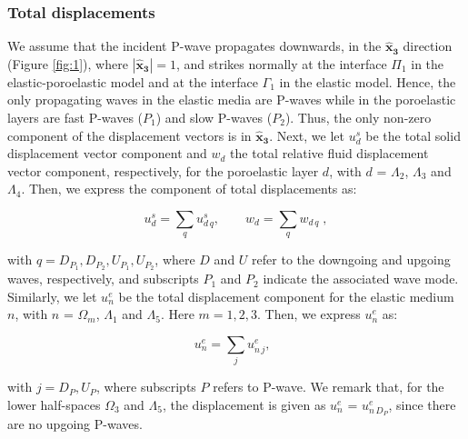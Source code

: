 \documentclass[draft]{agujournal2019}
\begin{document}
\subsubsection{Total displacements}
We assume that the incident P-wave propagates downwards, in the $\bm{\hat x_3}$ direction (Figure \ref{fig:1}), where $|\bm{\hat x_3}| =1$, and strikes normally at the interface $\Pi_1$  in the  elastic-poro\-elastic model and at the interface  $\Gamma_1$ in the elastic model. Hence, the only propagating waves in the elastic media are P-waves while in the poro\-elastic layers  are fast P-waves ($P_1$) and slow P-waves ($P_2$). Thus, the only non-zero component of the displacement vectors is in $\bm{\hat x_3}$.
Next, we let
$u{_d^s}$ be the total solid displacement vector component and $w_d$ the total relative fluid displacement vector component, respectively, for the poro\-elastic layer $d$, with $d$ = $\Lambda_2$, $\Lambda_3$ and $\Lambda_4$. Then, we express the component of total displacements as:
\begin{linenomath*}
\begin{equation}\label{Eq.8}
u_d^s =  \sum_q u_{d \,q}^s ,   \qquad
w_d = \sum_q  w_{d \,q}  \;,
\end{equation}
\end{linenomath*}
with $q=D_{P_1},D_{P_2}, U_{P_1},U_{P_2}$, where $D$ and $U$ refer to the downgoing and upgoing waves, respectively, and subscripts $P_1$ and $P_2$ indicate the associated wave mode.
Similarly,  we let $u_n^e$ be the total displacement component for the elastic medium $n$, with $n$ = $\Omega_m$, $\Lambda_1$  and $\Lambda_5$. Here $m = 1,2,3$.  Then, we express  $u_n^e$ as:
\begin{linenomath*}
\begin{equation}\label{Eq.9}
u_n^e = \sum _j u_{n\,j}^e , \; \; 
\end{equation}
\end{linenomath*}
with $j=D_P,U_P$, where subscripts $P$ refers to P-wave. We remark that, for the lower half-spaces $\Omega_3$ and $\Lambda_5$, the displacement is given as ${u_n^e}$ = $u_{n\,D_P}^e $, since there are no upgoing P-waves.
\end{document}
